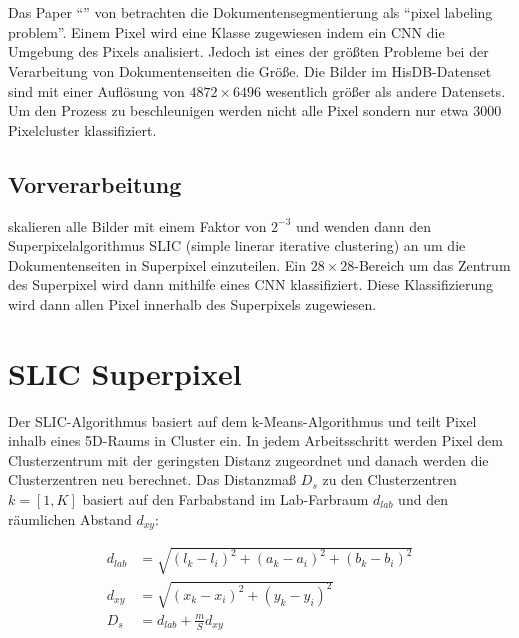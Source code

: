 \qq{}

\section{\textcite{ChenConvolutionalNeuralNetworks2017}}
Das Paper ``'' von \citeauthor*{ChenConvolutionalNeuralNetworks2017} betrachten die Dokumentensegmentierung 
als ``pixel labeling problem''. Einem Pixel wird eine Klasse zugewiesen indem
ein CNN die Umgebung des Pixels analisiert. 
Jedoch ist eines der größten Probleme bei der Verarbeitung von Dokumentenseiten die Größe.
Die Bilder im HisDB-Datenset sind mit einer Auflösung von \(4872 \times 6496\) wesentlich größer als andere Datensets.
Um den Prozess zu beschleunigen werden nicht alle Pixel sondern nur etwa 3000 Pixelcluster klassifiziert. 

\subsection{Vorverarbeitung}
\citeauthor{ChenConvolutionalNeuralNetworks2017} skalieren alle Bilder mit einem Faktor von  \(2^{-3}\) und wenden dann den Superpixelalgorithmus SLIC (simple linerar iterative clustering) an \parencite{AchantaSLICSuperpixels2010} um die Dokumentenseiten in Superpixel einzuteilen.
Ein \(28 \times 28\)-Bereich um das Zentrum des Superpixel wird dann mithilfe eines CNN
klassifiziert. Diese Klassifizierung wird dann allen Pixel innerhalb des Superpixels zugewiesen.

\section{SLIC Superpixel}
Der SLIC-Algorithmus basiert auf dem k-Means-Algorithmus und teilt Pixel inhalb eines 5D-Raums in Cluster ein. 
In jedem Arbeitsschritt werden Pixel dem Clusterzentrum mit der geringsten Distanz zugeordnet und danach werden die Clusterzentren neu berechnet.
Das Distanzmaß \(D_s\) zu den Clusterzentren \(k=[1,K]\) basiert auf den Farbabstand im Lab-Farbraum \(d_{lab}\) und den räumlichen Abstand \(d_{xy}\):

\begin{align}
    d_{lab} &= \sqrt{ \left( l_k - l_i \right)^2 + \left( a_k - a_i \right)^2 + \left( b_k - b_i \right)^2 }\\
    d_{xy}  &= \sqrt{ \left( x_k - x_i \right)^2 + \left(y_k - y_i \right)^2 }\\
    D_{s}   &= d_{lab} + \frac{m}{S} d_{xy}
\end{align}

